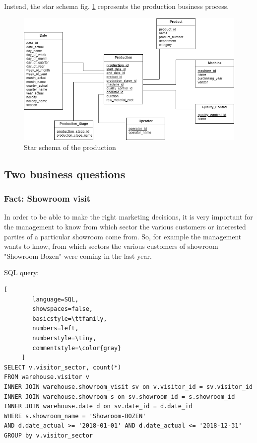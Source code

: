 \documentclass[letterpaper,12pt]{article}
\begin{document}
Instead, the star schema fig. \ref{fig:starschemaProduction} represents the production business process.

\begin{figure}[h] 
        \centering
        \includegraphics[width=\columnwidth]{../images/Starschema_Production.png}
        \caption{
                \label{fig:starschemaProduction}  
                Star schema of the production
        }
\end{figure}

\subsection{Two business questions}

\subsubsection{Fact: Showroom visit}

In order to be able to make the right marketing decisions, it is very important for the management to know from which sector the various customers or interested parties of a particular showroom come from. So, for example the management wants to know, from which sectors the various customers of showroom "Showroom-Bozen" were coming in the last year.

\bigskip
\noindent SQL query:
\begin{lstlisting}[
        language=SQL,
        showspaces=false,
        basicstyle=\ttfamily,
        numbers=left,
        numberstyle=\tiny,
        commentstyle=\color{gray}
     ]
SELECT v.visitor_sector, count(*)
FROM warehouse.visitor v
INNER JOIN warehouse.showroom_visit sv on v.visitor_id = sv.visitor_id
INNER JOIN warehouse.showroom s on sv.showroom_id = s.showroom_id
INNER JOIN warehouse.date d on sv.date_id = d.date_id
WHERE s.showroom_name = 'Showroom-BOZEN' 
AND d.date_actual >= '2018-01-01' AND d.date_actual <= '2018-12-31'
GROUP by v.visitor_sector
\end{lstlisting}
\end{document}
